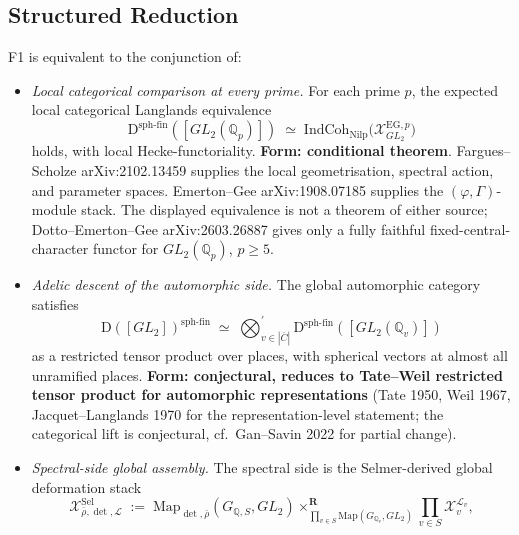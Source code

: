 \subsection{Structured Reduction}

\begin{theorem}[F1 reduction]
\label{v4-arith:thm:F1-reduction}
F1 is equivalent to the conjunction of:
\begin{itemize}
\item[\textbf{(F1.a)}] \emph{Local categorical comparison at every prime.}
For each prime \(p\), the expected local categorical Langlands equivalence
\begin{equation}
\mathrm{D}^{\mathrm{sph\text{-}fin}}([GL_{2}(\mathbb{Q}_{p})])\;\simeq\;\mathrm{IndCoh}_{\mathrm{Nilp}}\bigl(\mathcal{X}^{\mathrm{EG},p}_{GL_{2}}\bigr)
\end{equation}
holds, with local Hecke-functoriality.
\textbf{Form: conditional theorem}. Fargues--Scholze arXiv:2102.13459
supplies the local geometrisation, spectral action, and parameter
spaces. Emerton--Gee arXiv:1908.07185 supplies the
\((\varphi,\Gamma)\)-module stack. The displayed equivalence is not a
theorem of either source; Dotto--Emerton--Gee arXiv:2603.26887 gives
only a fully faithful fixed-central-character functor for
\(GL_{2}(\mathbb{Q}_{p})\), \(p\geq 5\).
\item[\textbf{(F1.b)}] \emph{Adelic descent of the automorphic side.}
The global automorphic category satisfies
\begin{equation}
\mathrm{D}([GL_{2}])^{\mathrm{sph\text{-}fin}}\;\simeq\;\bigotimes_{v\in|\overline{C}|}^{\prime}\mathrm{D}^{\mathrm{sph\text{-}fin}}([GL_{2}(\mathbb{Q}_{v})])
\end{equation}
as a restricted tensor product over places, with spherical vectors
at almost all unramified places.
\textbf{Form: conjectural, reduces to Tate--Weil restricted
tensor product for automorphic representations} (Tate 1950,
Weil 1967, Jacquet--Langlands 1970 for the representation-level
statement; the categorical lift is conjectural, cf.~Gan--Savin 2022
for partial change).
\item[\textbf{(F1.c)}] \emph{Spectral-side global assembly.}
The spectral side is the Selmer-derived global deformation stack
\begin{equation}
\mathcal{X}^{\mathrm{Sel}}_{\bar\rho,\det,\mathcal{L}}
\;:=\;
\mathrm{Map}_{\det,\bar\rho}(G_{\mathbb{Q},S},GL_{2})
\times^{\mathbf{R}}_{\prod_{v\in S}\mathrm{Map}(G_{\mathbb{Q}_{v}},GL_{2})}
\prod_{v\in S}\mathcal{X}^{\mathcal{L}_{v}}_{v},

\end{equation}
\end{itemize}
\end{theorem}
